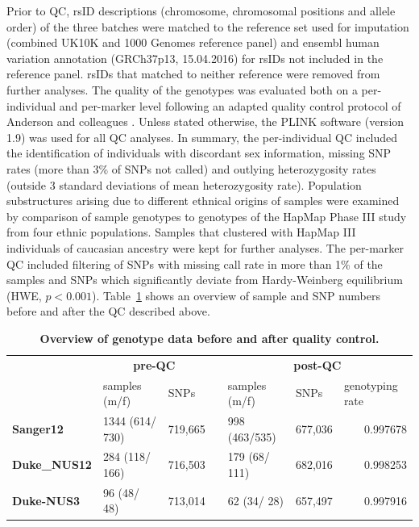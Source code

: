 Prior to QC, rsID descriptions (chromosome, chromosomal positions and allele order) of the three batches were matched to the reference set used for imputation (combined UK10K \citep{UK10KConsortium2014} and 1000 Genomes \citep{Abecasis2012} reference panel) and ensembl human variation annotation (GRCh37p13, 15.04.2016) for rsIDs not included in the reference panel. rsIDs that matched to neither reference were removed from further analyses. The quality of the genotypes was evaluated both on a per-individual and per-marker level following an adapted quality control protocol of Anderson and colleagues \citep{Anderson2010}. Unless stated otherwise, the PLINK software (version 1.9) \citep{Purcell2007, Chang2015} was used for all QC analyses. In summary, the per-individual QC included the identification of individuals with discordant sex information, missing SNP rates (more than 3\% of SNPs not called) and outlying heterozygosity rates (outside 3 standard deviations of mean heterozygosity rate). Population substructures arising due to different ethnical origins of samples were examined by comparison of sample genotypes to genotypes of the HapMap Phase III study \citep{HapMap2005} from four ethnic populations. Samples that clustered with HapMap III individuals of caucasian ancestry were kept for further analyses. The per-marker QC included filtering of SNPs with missing call rate in more than 1\% of the samples and SNPs which significantly deviate from Hardy-Weinberg equilibrium (HWE, \(p < 0.001\)).  Table~\ref{tab:genoOverview} shows an overview of sample and SNP numbers before and after the QC described above. 
\\
\begin{table}[htbp]
  \centering
  \caption{\textbf{Overview of genotype data before and after quality control.}}
    \begin{tabular}{llrllrr}
    		\toprule
          & \multicolumn{2}{c}{\textbf{pre-QC}} &  &\multicolumn{3}{c}{\textbf{post-QC}} \\
          \cmidrule{2-3}\cmidrule{5-7}
          & samples (m/f) & \multicolumn{1}{l}{SNPs} & & samples (m/f) & \multicolumn{1}{l}{SNPs} & \multicolumn{1}{l}{genotyping rate} \\
            \cmidrule{2-7}
    \textbf{Sanger12} & 1344  (614/  730) & 719,665 & & 998 (463/535) & 677,036 & 0.997678 \\
    \textbf{Duke\_NUS12} & 284 (118/ 166) & 716,503 &  &179 (68/ 111) & 682,016 & 0.998253 \\
    \textbf{Duke-NUS3} & 96 (48/ 48) & 713,014 &  &62 (34/ 28) & 657,497 & 0.997916 \\
    \bottomrule
    \end{tabular}%
  \label{tab:genoOverview}%
\end{table}%

